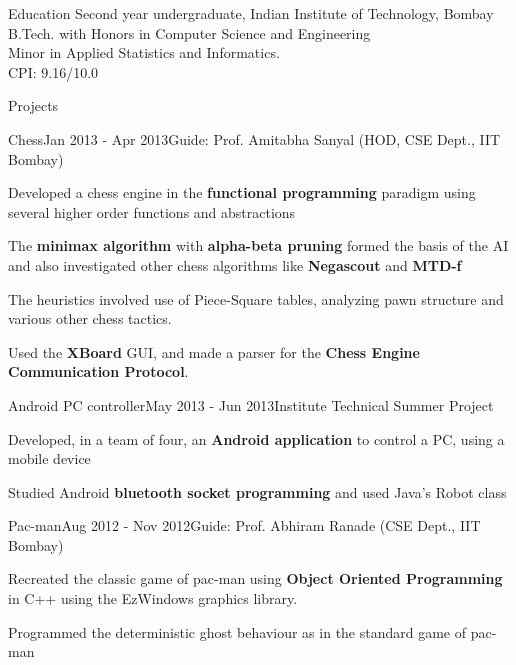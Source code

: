 \documentclass{resume2} %
\begin{document}
\begin{rSection}{Education}
Second year undergraduate, Indian Institute of Technology, Bombay \\B.Tech. with Honors in Computer Science and Engineering \\ Minor in Applied Statistics and Informatics. \\ CPI: 9.16/10.0
\end{rSection}

\begin{rSection}{Projects}

\begin{rSubsection}{Chess}{Jan 2013 - Apr 2013}{Guide: Prof. Amitabha Sanyal (HOD, CSE Dept., IIT Bombay)
}{}
\item Developed a chess engine in the \textbf{functional programming} paradigm using several higher order functions and abstractions
\item The \textbf{minimax algorithm} with \textbf{alpha-beta pruning} formed the basis of the AI and also investigated other chess algorithms like \textbf{Negascout} and \textbf{MTD-f} \item The heuristics involved use of Piece-Square tables, analyzing pawn structure and various other chess tactics. 
\item Used the \textbf{XBoard} GUI, and made a parser for the \textbf{Chess Engine Communication Protocol}.
\end{rSubsection}


\begin{rSubsection}{Android PC controller}{May 2013 - Jun 2013}{Institute Technical Summer Project}{}
\item Developed, in a team of four, an \textbf{Android application} to control a PC, using a mobile device
\item Studied Android \textbf{bluetooth socket programming} and used Java's Robot class

\end{rSubsection}

\begin{rSubsection}{Pac-man}{Aug 2012 - Nov 2012}{Guide: Prof. Abhiram Ranade (CSE Dept., IIT Bombay)
}{}
\item Recreated the classic game of pac-man using \textbf{Object Oriented Programming} in C++ using the EzWindows graphics library.
\item Programmed the deterministic ghost behaviour as in the standard game of pac-man

\end{rSubsection}



\end{rSection}
\end{document}
